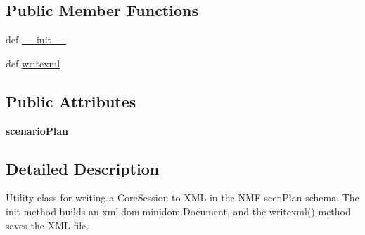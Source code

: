 \subsection*{Public Member Functions}
\begin{DoxyCompactItemize}
\item 
def \hyperlink{classcore_1_1misc_1_1xmlwriter1_1_1_core_document_writer1_a980a210bca38f86d96d35e621c1fb0a5}{\+\_\+\+\_\+init\+\_\+\+\_\+}
\item 
def \hyperlink{classcore_1_1misc_1_1xmlwriter1_1_1_core_document_writer1_a45ad5375762a7642a438819e78dfd087}{writexml}
\end{DoxyCompactItemize}
\subsection*{Public Attributes}
\begin{DoxyCompactItemize}
\item 
\hypertarget{classcore_1_1misc_1_1xmlwriter1_1_1_core_document_writer1_a8b8b626a50bdb9917755f9add18a4e6a}{{\bfseries scenario\+Plan}}\label{classcore_1_1misc_1_1xmlwriter1_1_1_core_document_writer1_a8b8b626a50bdb9917755f9add18a4e6a}

\end{DoxyCompactItemize}


\subsection{Detailed Description}
\begin{DoxyVerb}Utility class for writing a CoreSession to XML in the NMF scenPlan schema. The init
method builds an xml.dom.minidom.Document, and the writexml() method saves the XML file.
\end{DoxyVerb}
 

